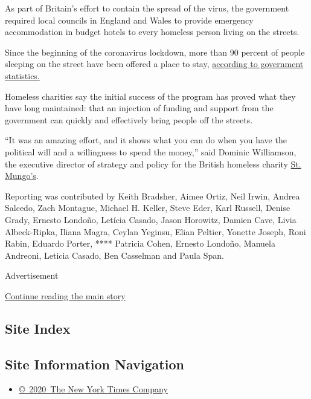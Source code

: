 As part of Britain's effort to contain the spread of the virus, the
government required local councils in England and Wales to provide
emergency accommodation in budget hotels to every homeless person living
on the streets.

Since the beginning of the coronavirus lockdown, more than 90 percent of
people sleeping on the street have been offered a place to stay,
\href{https://www.gov.uk/government/news/6-000-new-supported-homes-as-part-of-landmark-commitment-to-end-rough-sleeping}{according
to government statistics.}

Homeless charities say the initial success of the program has proved
what they have long maintained: that an injection of funding and support
from the government can quickly and effectively bring people off the
streets.

``It was an amazing effort, and it shows what you can do when you have
the political will and a willingness to spend the money,'' said Dominic
Williamson, the executive director of strategy and policy for the
British homeless charity
\href{https://www.mungos.org/homelessness/how-to-help-during-coronavirus/?gclid=EAIaIQobChMIxp2_7pvj6QIVgbTtCh2X-wwDEAAYASAAEgIER_D_BwE}{St.
Mungo's}.

Reporting was contributed by Keith Bradsher, Aimee Ortiz, Neil Irwin,
Andrea Salcedo, Zach Montague, Michael H. Keller, Steve Eder, Karl
Russell, Denise Grady, Ernesto Londoño, Letícia Casado, Jason Horowitz,
Damien Cave, Livia Albeck-Ripka, Iliana Magra, Ceylan Yeginsu, Elian
Peltier, Yonette Joseph, Roni Rabin, Eduardo Porter, **** Patricia
Cohen, Ernesto Londoño, Manuela Andreoni, Leticia Casado, Ben Casselman
and Paula Span.

Advertisement

\protect\hyperlink{after-bottom}{Continue reading the main story}

\hypertarget{site-index}{%
\subsection{Site Index}\label{site-index}}

\hypertarget{site-information-navigation}{%
\subsection{Site Information
Navigation}\label{site-information-navigation}}

\begin{itemize}
\tightlist
\item
  \href{https://help.nytimes3xbfgragh.onion/hc/en-us/articles/115014792127-Copyright-notice}{©~2020~The
  New York Times Company}
\end{itemize}

